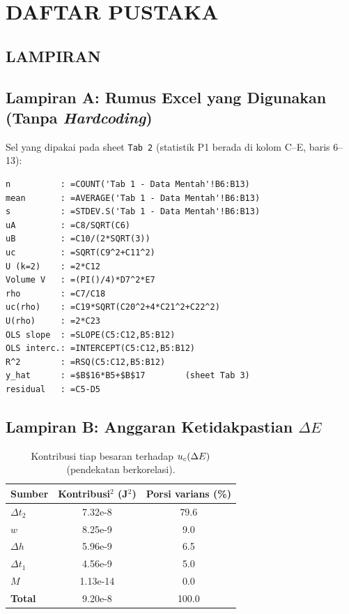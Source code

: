 \documentclass[a4paper, 12pt]{article}
\begin{document}
    \section{DAFTAR PUSTAKA}
    \printbibliography[heading=none]

    \newpage
    \begin{center}
        \section{LAMPIRAN}
    \end{center}

    \appendix

    \subsection*{Lampiran A: Rumus Excel yang Digunakan (Tanpa \textit{Hardcoding})}
    \noindent Sel yang dipakai pada sheet \texttt{Tab 2} (statistik P1 berada di kolom C--E, baris 6--13):

\begin{lstlisting}
n          : =COUNT('Tab 1 - Data Mentah'!B6:B13)
mean       : =AVERAGE('Tab 1 - Data Mentah'!B6:B13)
s          : =STDEV.S('Tab 1 - Data Mentah'!B6:B13)
uA         : =C8/SQRT(C6)
uB         : =C10/(2*SQRT(3))
uc         : =SQRT(C9^2+C11^2)
U (k=2)    : =2*C12
Volume V   : =(PI()/4)*D7^2*E7
rho        : =C7/C18
uc(rho)    : =C19*SQRT(C20^2+4*C21^2+C22^2)
U(rho)     : =2*C23
OLS slope  : =SLOPE(C5:C12,B5:B12)
OLS interc.: =INTERCEPT(C5:C12,B5:B12)
R^2        : =RSQ(C5:C12,B5:B12)
y_hat      : =$B$16*B5+$B$17        (sheet Tab 3)
residual   : =C5-D5
\end{lstlisting}

    \subsection*{Lampiran B: Anggaran Ketidakpastian $\Delta E$}
    \begin{table}[H]
    \centering
    \singlespacing
    \caption{Kontribusi tiap besaran terhadap $\uc(\Delta E)$ (pendekatan berkorelasi).}
    \label{tab:budgetE}
    \small
    \begin{tabular}{l S[table-format=1.2e-1] S[table-format=3.1]}
    \toprule
    \textbf{Sumber} & {Kontribusi$^2$ (J$^2$)} & {Porsi varians (\%)}\\
    \midrule
    $\Delta t_2$ & 7.32e-8 & 79.6\\
    $w$ & 8.25e-9 & 9.0\\
    $\Delta h$ & 5.96e-9 & 6.5\\
    $\Delta t_1$ & 4.56e-9 & 5.0\\
    $M$ & 1.13e-14 & 0.0\\
    \midrule
    \textbf{Total} & 9.20e-8 & 100.0\\
    \bottomrule
    \end{tabular}
    \end{table}
\end{document}
